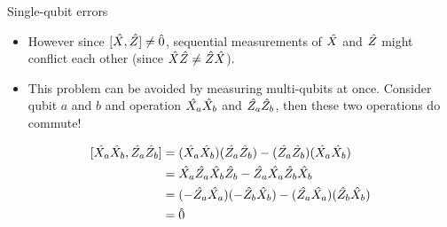 \documentclass{beamer}
\begin{document}
    \begin{frame}{Single-qubit errors}
        \begin{itemize}
            \item However since $ [\shat{X}, \shat{Z}] \neq \hat{0} $, sequential measurements of $ \shat{X} $ and $ \shat{Z} $ might conflict each other (since $ \shat{X}\shat{Z} \neq \shat{Z}\shat{X} $).
            \item This problem can be avoided by measuring multi-qubits at once. Consider qubit $ a $ and $ b $ and operation $ \sshat{X_a}\sshat{X_b} $ and $ \sshat{Z_a}\sshat{Z_b} $, then these two operations do commute!
        \end{itemize}
        \begin{equation}
        \begin{split}
        [\sshat{X_a}\sshat{X_b}, \sshat{Z_a}\sshat{Z_b}] &= (\sshat{X_a}\sshat{X_b})(\sshat{Z_a}\sshat{Z_b}) - (\sshat{Z_a}\sshat{Z_b})(\sshat{X_a}\sshat{X_b}) \\
        &= \sshat{X_a}\sshat{Z_a}\sshat{X_b}\sshat{Z_b} - \sshat{Z_a}\sshat{X_a}\sshat{Z_b}\sshat{X_b} \\
        &= (-\sshat{Z_a}\sshat{X_a})(-\sshat{Z_b}\sshat{X_b}) - (\sshat{Z_a}\sshat{X_a})(\sshat{Z_b}\sshat{X_b}) \\
        &= \hat{0}
        \end{split}
        \end{equation}
    \end{frame}
    
\end{document}
